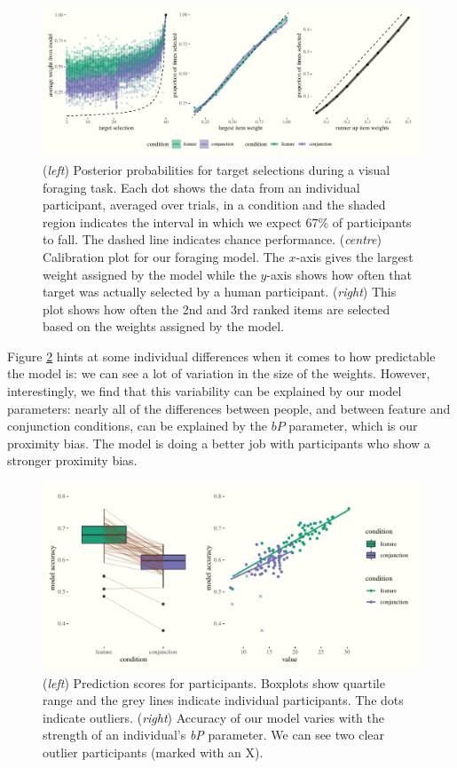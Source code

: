 \documentclass[vision,article,submit,pdftex,moreauthors]{Definitions/mdpi}
\begin{document}
\begin{figure}[H]
\centering
\includegraphics[width=12 cm]{Figures/qjep_preds.pdf}
\caption{(\textit{left}) Posterior probabilities for target selections during a visual foraging task. Each dot shows the  data from an individual participant, averaged over trials, in a condition and the shaded region indicates the interval in which we expect 67\% of participants to fall. The dashed line indicates chance performance. (\textit{centre})  Calibration plot for our foraging model. The $x$-axis gives the largest weight assigned by the model while the $y$-axis shows how often that target was actually selected by a human participant. (\textit{right}) This plot shows how often the 2nd and 3rd ranked items are selected based on the weights assigned by the model.}
\label{fig:cal}
\end{figure}   

Figure \ref{fig:cal2} hints at some individual differences when it comes to how predictable the model is: we can see a lot of variation in the size of the weights. However, interestingly, we find that this variability can be explained by our model parameters: nearly all of the differences between people, and between feature and conjunction conditions, can be explained by the $bP$ parameter, which is our proximity bias. The model is doing a better job with participants who show a stronger proximity bias. 

\begin{figure}[H]
\centering
\includegraphics[width=12 cm]{Figures/qjep_indiv_diff.pdf}
\caption{(\textit{left}) Prediction scores for participants. Boxplots show quartile range and the grey lines indicate individual participants. The dots indicate outliers. (\textit{right}) Accuracy of our model varies with the strength of an individual’s \textit{bP} parameter. We can see two clear outlier participants (marked with an X).}
\label{fig:cal2}
\end{figure}   
\end{document}
